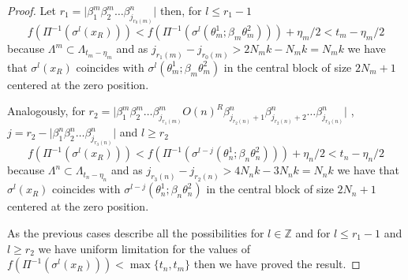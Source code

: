 \documentclass[10pt,a4paper]{amsart}
\providecommand{\abs}[1]{\lvert#1\rvert}
\begin{document}
\begin{proof}
Let $r_1=\abs{\beta^m_1\beta^m_2\dots \beta^n_{j_{r_0(m)}}}$ then, for $l\leq r_1-1$
$$f(\Pi^{-1}(\sigma^l(x_R)))<f(\Pi^{-1}(\sigma^l(\theta_m^{1};\beta_m\theta_m^{2})))+\eta_m/2<t_m-\eta_m/2$$
because $\Lambda^{m}\subset \Lambda_{t_m-\eta_m}$ and as $j_{r_1(m)}-j_{r_0(m)}>2N_mk-N_mk=N_mk$ we have that $\sigma^l(x_R)$ coincides with $\sigma^l(\theta_m^{1};\beta_m\theta_m^{2})$ in the central block of size $2N_m+1$ centered at the zero position.  

Analogously, for $r_2=\abs{\beta^m_1\beta^m_2\dots\beta^m_{j_{r_1(m)}}O(n)^R \beta^n_{j_{r_2(n)}+1}\beta^n_{j_{r_2(n)}+2}\dots\beta^n_{j_{r_3(n)}}}$ , $j=r_2-\abs{\beta^n_1\beta^n_2\dots\beta^n_{j_{r_3(n)}}}$ and $l\geq r_2$
$$f(\Pi^{-1}(\sigma^l(x_R)))<f(\Pi^{-1}(\sigma^{l-j}(\theta_n^{1};\beta_n\theta_n^{2})))+\eta_n/2<t_n-\eta_n/2$$
because $\Lambda^{n}\subset \Lambda_{t_n-\eta_n}$ and as $j_{r_3(n)}-j_{r_2(n)}>4N_nk-3N_nk=N_nk$ we have that $\sigma^l(x_R)$ coincides with $\sigma^{l-j}(\theta_n^{1};\beta_n\theta_n^{2})$ in the central block of size $2N_n+1$ centered at the zero position.   

As the previous cases describe all the possibilities for $l\in \mathbb{Z}$ and for $l\leq r_1-1$ and $l\geq r_2$
we have uniform limitation for the values of $f(\Pi^{-1}(\sigma^l(x_R)))<\max\{t_n,t_m\}$ then we have proved the result.
\end{proof}
\end{document}
